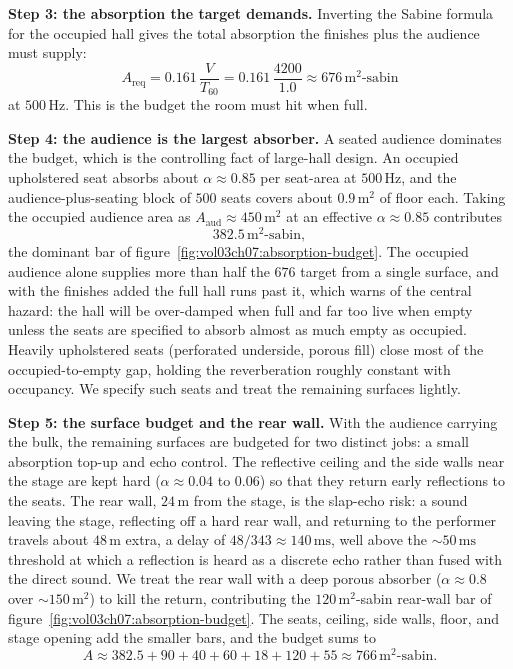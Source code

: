 \textbf{Step 3: the absorption the target demands.} Inverting the Sabine
formula for the occupied hall gives the total absorption the finishes plus
the audience must supply:
\[
A_{\text{req}} = 0.161\,\frac{V}{T_{60}}
              = 0.161\,\frac{4200}{1.0}
              \approx 676\,\si{\meter\squared}\text{-sabin}
\]
at $500\,\si{\hertz}$. This is the budget the room must hit when full.

\textbf{Step 4: the audience is the largest absorber.} A seated audience
dominates the budget, which is the controlling fact of large-hall design.
An occupied upholstered seat absorbs about
$\alpha\approx 0.85$ per seat-area at $500\,\si{\hertz}$, and the
audience-plus-seating block of $500$ seats covers about
$0.9\,\si{\meter\squared}$ of floor each. Taking the occupied audience
area as $A_{\text{aud}}\approx 450\,\si{\meter\squared}$ at an effective
$\alpha\approx 0.85$ contributes
\[
382.5\,\si{\meter\squared}\text{-sabin},
\]
the dominant bar of figure~\ref{fig:vol03ch07:absorption-budget}. The
occupied audience alone supplies more than half the $676$ target from a
single surface, and with the finishes added the full hall runs past it,
which warns of
the central hazard: the hall will be over-damped when full and far too
live when empty unless the seats are specified to absorb almost as much
empty as occupied. Heavily upholstered seats (perforated underside,
porous fill) close most of the occupied-to-empty gap, holding the
reverberation roughly constant with occupancy. We specify such seats and
treat the remaining surfaces lightly.

\textbf{Step 5: the surface budget and the rear wall.} With the audience
carrying the bulk, the remaining surfaces are budgeted for two distinct
jobs: a small absorption top-up and echo control. The reflective ceiling
and the side walls near the stage are kept hard ($\alpha\approx 0.04$ to
$0.06$) so that they return early reflections to the seats. The rear wall,
$24\,\si{\meter}$ from the stage, is the slap-echo risk: a sound leaving
the stage, reflecting off a hard rear wall, and returning to the
performer travels about $48\,\si{\meter}$ extra, a delay of
$48/343\approx 140\,\si{\milli\second}$, well above the
$\sim 50\,\si{\milli\second}$ threshold at which a reflection is heard as
a discrete echo rather than fused with the direct sound. We treat the
rear wall with a deep porous absorber ($\alpha\approx 0.8$ over
$\sim 150\,\si{\meter\squared}$) to kill the return, contributing the
$120\,\si{\meter\squared}$-sabin rear-wall bar of
figure~\ref{fig:vol03ch07:absorption-budget}. The seats, ceiling, side
walls, floor, and stage opening add the smaller bars, and the budget
sums to
\[
A \approx 382.5 + 90 + 40 + 60 + 18 + 120 + 55
      \approx 766\,\si{\meter\squared}\text{-sabin}.
\]

